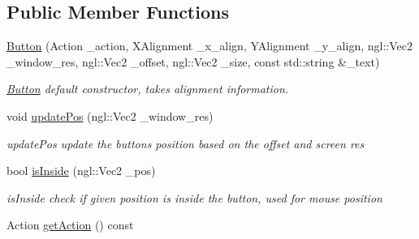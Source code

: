 \subsection*{Public Member Functions}
\begin{DoxyCompactItemize}
\item 
\hyperlink{class_button_aa45a9b2d50ae10e791b80910d91dcb51}{Button} (Action \+\_\+action, X\+Alignment \+\_\+x\+\_\+align, Y\+Alignment \+\_\+y\+\_\+align, ngl\+::\+Vec2 \+\_\+window\+\_\+res, ngl\+::\+Vec2 \+\_\+offset, ngl\+::\+Vec2 \+\_\+size, const std\+::string \&\+\_\+text)
\begin{DoxyCompactList}\small\item\em \hyperlink{class_button}{Button} default constructor, takes alignment information. \end{DoxyCompactList}\item 
void \hyperlink{class_button_a1f4031837f5c0db319dcc840a1eff177}{update\+Pos} (ngl\+::\+Vec2 \+\_\+window\+\_\+res)
\begin{DoxyCompactList}\small\item\em update\+Pos update the button\textquotesingle{}s position based on the offset and screen res \end{DoxyCompactList}\item 
bool \hyperlink{class_button_a342c05f57833ea0bb12531e45f5458d4}{is\+Inside} (ngl\+::\+Vec2 \+\_\+pos)
\begin{DoxyCompactList}\small\item\em is\+Inside check if given position is inside the button, used for mouse position \end{DoxyCompactList}\item 
\hypertarget{class_button_a8247c77e9bdb3b1f2af58bc69df39d90}{}Action \hyperlink{class_button_a8247c77e9bdb3b1f2af58bc69df39d90}{get\+Action} () const \label{class_button_a8247c77e9bdb3b1f2af58bc69df39d90}


\end{DoxyCompactItemize}
